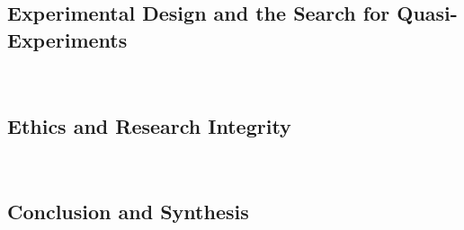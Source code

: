 \documentclass[12pt,a4paper]{article}
\newcommand{\lecture}[3][\DefaultOpt]{%
  \def\DefaultOpt{#2}%
  \clearpage\subsection[#1]{#2}\emph{#3}\vspace{.25em}\\
}
\newcommand{\reading}[2][]{\noindent -- {#1}\bibentry{#2}.\vspace{.25em}\\}
\newcommand{\textbook}[2][]{\noindent -- {#1}#2.\vspace{.25em}\\}
\begin{document}
\lecture{Experimental Design and the Search for Quasi-Experiments}{}




\lecture{Ethics and Research Integrity}{}

\lecture{Conclusion and Synthesis}{}





\end{document}
